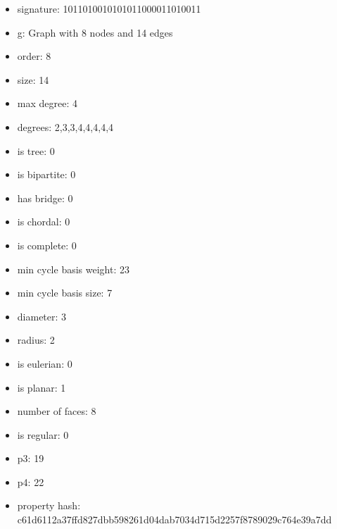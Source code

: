 \begin{itemize}
\item signature: 1011010010101011000011010011
\item g: Graph with 8 nodes and 14 edges
\item order: 8
\item size: 14
\item max degree: 4
\item degrees: 2,3,3,4,4,4,4,4
\item is tree: 0
\item is bipartite: 0
\item has bridge: 0
\item is chordal: 0
\item is complete: 0
\item min cycle basis weight: 23
\item min cycle basis size: 7
\item diameter: 3
\item radius: 2
\item is eulerian: 0
\item is planar: 1
\item number of faces: 8
\item is regular: 0
\item p3: 19
\item p4: 22
\item property hash: c61d6112a37ffd827dbb598261d04dab7034d715d2257f8789029c764e39a7dd
\end{itemize}
\newpage
\begin{figure}
\end{figure}
